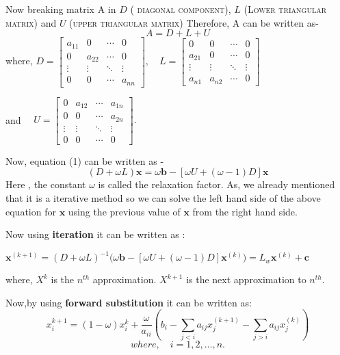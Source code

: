 \documentclass{article}
\begin{document}
Now breaking matrix A in $D$ (\textsc{ diagonal component}), $L$ (\textsc{Lower triangular matrix}) and  $U$ (\textsc{upper triangular matrix})\linebreak  
Therefore, A can be written as-
\begin{equation} \label{eq2}
A = D + L + U
\end{equation}
where,
\hspace*{10mm}
$D={\begin{bmatrix}a_{11}&0&\cdots &0\\0&a_{22}&\cdots &0\\\vdots &\vdots &\ddots &\vdots \\0&0&\cdots &a_{nn}\end{bmatrix}},\quad L={\begin{bmatrix}0&0&\cdots &0\\a_{21}&0&\cdots &0\\\vdots &\vdots &\ddots &\vdots \\a_{n1}&a_{n2}&\cdots &0\end{bmatrix}}$\linebreak

and
\hspace{8mm}
$\quad U={\begin{bmatrix}0&a_{12}&\cdots &a_{1n}\\0&0&\cdots &a_{2n}\\\vdots &\vdots &\ddots &\vdots \\0&0&\cdots &0\end{bmatrix}}.$

Now, equation (1) can  be written as -
\begin{equation} \label{eq3}
(D+\omega L)\mathbf {x} =\omega \mathbf {b} -[\omega U+(\omega -1)D]\mathbf {x} 
\end{equation}
Here , the constant $\omega$ is called the relaxation factor.\linebreak
As, we already mentioned that it is a iterative method so we can solve the left hand side of the above equation  for $\mathbf{x}$ using the previous value of $\mathbf{x}$ from the right hand side.

Now using \textbf{iteration } it can be written as :

$\mathbf {x} ^{(k+1)}=(D+\omega L)^{-1}{\big (}\omega \mathbf {b} -[\omega U+(\omega -1)D]\mathbf {x} ^{(k)}{\big )}=L_{w}\mathbf {x} ^{(k)}+\mathbf {c}$

where,\linebreak 
\hspace*{10mm}\textbf{$X^k$} is the $n^{th}$ approximation. \linebreak 
\hspace*{10mm}\textbf{$X^{k+1}$} is the next approximation to $n^{th}$. \linebreak

Now,by using \textbf{forward substitution} it can be written as:
\[
x_{i}^{k+1}=(1-\omega )x_{i}^{k}+{\frac {\omega }{a_{ii}}}\left(b_{i}-\sum _{j<i}a_{ij}x_{j}^{(k+1)}-\sum _{j>i}a_{ij}x_{j}^{(k)}\right)\]
\[where ,\quad i=1,2,\ldots ,n.
\]
\end{document}
